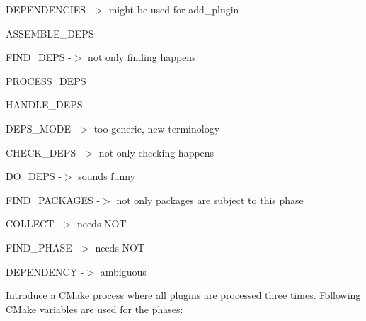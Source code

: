 \begin{DoxyItemize}
\item {\ttfamily D\+E\+P\+E\+N\+D\+E\+N\+C\+I\+ES} -\/$>$ might be used for {\ttfamily add\+\_\+plugin}
\item {\ttfamily A\+S\+S\+E\+M\+B\+L\+E\+\_\+\+D\+E\+PS}
\item {\ttfamily F\+I\+N\+D\+\_\+\+D\+E\+PS} -\/$>$ not only finding happens
\item {\ttfamily P\+R\+O\+C\+E\+S\+S\+\_\+\+D\+E\+PS}
\item {\ttfamily H\+A\+N\+D\+L\+E\+\_\+\+D\+E\+PS}
\item {\ttfamily D\+E\+P\+S\+\_\+\+M\+O\+DE} -\/$>$ too generic, new terminology
\item {\ttfamily C\+H\+E\+C\+K\+\_\+\+D\+E\+PS} -\/$>$ not only checking happens
\item {\ttfamily D\+O\+\_\+\+D\+E\+PS} -\/$>$ sounds funny
\item {\ttfamily F\+I\+N\+D\+\_\+\+P\+A\+C\+K\+A\+G\+ES} -\/$>$ not only packages are subject to this phase
\item {\ttfamily C\+O\+L\+L\+E\+CT} -\/$>$ needs N\+OT
\item {\ttfamily F\+I\+N\+D\+\_\+\+P\+H\+A\+SE} -\/$>$ needs N\+OT
\item {\ttfamily D\+E\+P\+E\+N\+D\+E\+N\+CY} -\/$>$ ambiguous
\end{DoxyItemize}

Introduce a C\+Make process where all plugins are processed three times. Following C\+Make variables are used for the phases\+:


